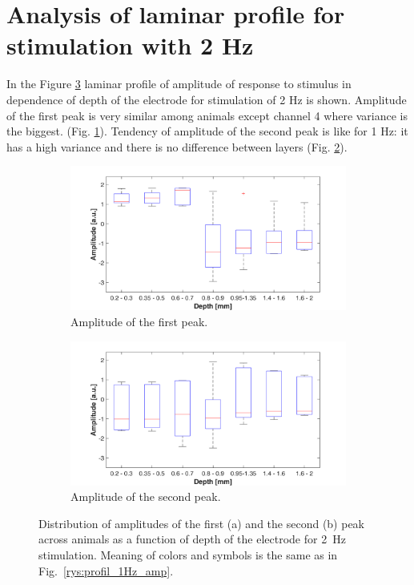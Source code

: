 \documentclass{pracalicmgr}
\begin{document}
 
 \section{Analysis of laminar profile for stimulation with 2 Hz}
  
    In the Figure \ref{rys:profil_2Hz_amp} laminar profile of amplitude of response to stimulus in dependence of depth of the electrode for stimulation of 2 Hz is shown. Amplitude of the first peak is very similar among animals except channel 4 where variance is the biggest. (Fig. \ref{rys:profil_2Hz_amp1}). Tendency of amplitude of the second peak is like for 1 Hz: it has a high variance and there is no difference between layers (Fig. \ref{rys:profil_2Hz_amp2}).
  
 	\begin{figure}[H]
 	\begin{subfigure}{.5\textwidth}
 		\centering
 		\includegraphics[width=1.\linewidth]{profile_2Hz_amp.png}
 		\caption{Amplitude of the first peak.}
 		\label{rys:profil_2Hz_amp1}
 	\end{subfigure}%
 	\begin{subfigure}{.5\textwidth}
 		\centering
 		\includegraphics[width=1.\linewidth]{profile_2Hz_amp2.png}
 		\caption{Amplitude of the second peak.}
 		\label{rys:profil_2Hz_amp2}
 	\end{subfigure}
 	
 	\caption{Distribution of amplitudes of the first (a) and the second (b) peak across animals as a function of depth of the electrode for 2~Hz stimulation. Meaning of colors and symbols is the same as in Fig.~\ref{rys:profil_1Hz_amp}.}
 	\label{rys:profil_2Hz_amp}
 \end{figure}
\end{document}
